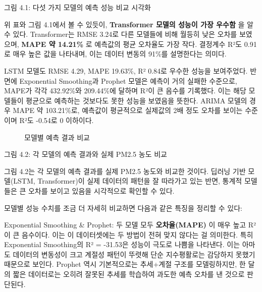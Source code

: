 \documentclass[12pt,ko,a4,]{report}
\begin{document}
그림 4.1: 다섯 가지 모델의 예측 성능 비교 시각화

위 표와 그림 4.1에서 볼 수 있듯이, \textbf{Transformer 모델의 성능이
가장 우수함} 을 알 수 있다. Transformer는 RMSE 3.24로 다른 모델들에 비해
월등히 낮은 오차를 보였으며, \textbf{MAPE 약 14.21\%} 로 예측값의 평균
오차율도 가장 작다. 결정계수 R²도 0.91로 매우 높은 값을 나타내며, 이는
데이터 변동의 91\%를 설명한다는 의미다.

LSTM 모델도 RMSE 4.29, MAPE 19.63\%, R² 0.84로 우수한 성능을 보여주었다.
반면에 Exponential Smoothing과 Prophet 모델은 예측이 거의 실패한
수준으로, MAPE가 각각 432.92\%와 209.44\%에 달하며 R²이 큰 음수를
기록했다. 이는 해당 모델들이 평균으로 예측하는 것보다도 못한 성능을
보였음을 뜻한다. ARIMA 모델의 경우 MAPE 약 103.21\%로, 예측값이
평균적으로 실제값의 2배 정도 오차를 보이는 수준이며 R²도 -0.54로 0
이하이다.

\begin{figure}
\centering
{}
\caption{모델별 예측 결과 비교}
\end{figure}

그림 4.2: 각 모델의 예측 결과와 실제 PM2.5 농도 비교

그림 4.2는 각 모델의 예측 결과를 실제 PM2.5 농도와 비교한 것이다. 딥러닝
기반 모델(LSTM, Transformer)이 실제 데이터의 패턴을 잘 따라가고 있는
반면, 통계적 모델들은 큰 오차를 보이고 있음을 시각적으로 확인할 수 있다.

모델별 성능 수치를 조금 더 자세히 비교하면 다음과 같은 특징을 정리할 수
있다:

Exponential Smoothing \& Prophet: 두 모델 모두 \textbf{오차율(MAPE)} 이
매우 높고 R²이 큰 음수이다. 이는 이 데이터셋에는 두 방법이 전혀 맞지
않다는 걸 의미한다. 특히 Exponential Smoothing의 R² = -31.53은 성능이
극도로 나쁨을 나타낸다. 이는 아마도 데이터의 변동성이 크고 계절성 패턴이
뚜렷해 단순 지수평활로는 감당하지 못했기 때문으로 보인다. Prophet 역시
기본적으로는 추세+계절 구조를 모델링하지만, 한 달의 짧은 데이터로는
오히려 잘못된 추세를 학습하여 과도한 예측 오차를 낸 것으로 판단된다.
\end{document}
